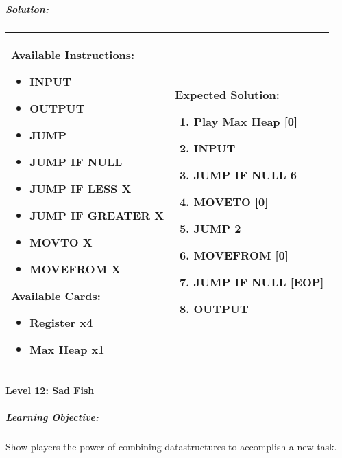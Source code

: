 \subparagraph{Solution:} 
\begin{center}
    \begin{tabular}{ | m{5cm} | m{9cm} | } 
        \hline
            \textbf{Available Instructions:} 
            \begin{itemize}
                \setlength\itemsep{-.35em}
                \item INPUT
                \item OUTPUT
                \item JUMP
                \item JUMP IF NULL
                \item JUMP IF LESS X
                \item JUMP IF GREATER X
                \item MOVTO X
                \item MOVEFROM X
            \end{itemize}
            \textbf{Available Cards:} 
            \begin{itemize}
                \setlength\itemsep{-.35em}
                \item Register x4
                \item Max Heap x1
            \end{itemize}& 
            \textbf{Expected Solution:} 
            \begin{enumerate}
                \setlength\itemsep{-.35em}
                \item Play Max Heap [0]
                \item INPUT
                \item JUMP IF NULL 6
                \item MOVETO [0]
                \item JUMP 2
                \item MOVEFROM [0]
                \item JUMP IF NULL [EOP]
                \item OUTPUT
            \end{enumerate}
            \\
        \hline
    \end{tabular}
\end{center}

\paragraph{Level 12: Sad Fish}
\subparagraph{Learning Objective:} Show players the power of combining datastructures to accomplish a new task.

